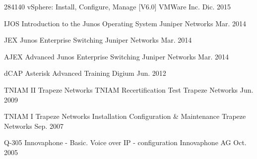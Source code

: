 \begin{cvhonors}


\cvhonor
{284140} %
{vSphere: Install, Configure, Manage [V6.0]} %
{VMWare Inc.} %
{Dic. 2015} %

\cvhonor
{IJOS} %
{Introduction to the Junos Operating System} %
{Juniper Networks} %
{Mar. 2014} %

\cvhonor
{JEX} %
{Junos Enterprise Switching} %
{Juniper Networks} %
{Mar. 2014} %

\cvhonor
{AJEX} %
{Advanced Junos Enterprise Switching} %
{Juniper Networks} %
{Mar. 2014} %


\cvhonor
{dCAP} %
{Asterisk Advanced Training} %
{Digium\textregistered} %
{Jun. 2012} %


\cvhonor
{TNIAM II} %
{Trapeze Networks TNIAM Recertification Test} %
{Trapeze Networks} %
{Jun. 2009} %


\cvhonor
{TNIAM I} %
{Trapeze Networks Installation Configuration \& Maintenance} %
{Trapeze Networks} %
{Sep. 2007} %



\cvhonor
{Q-305} %
{Innovaphone - Basic. Voice over IP - configuration} %
{Innovaphone AG} %
{Oct. 2005} %

\end{cvhonors}
